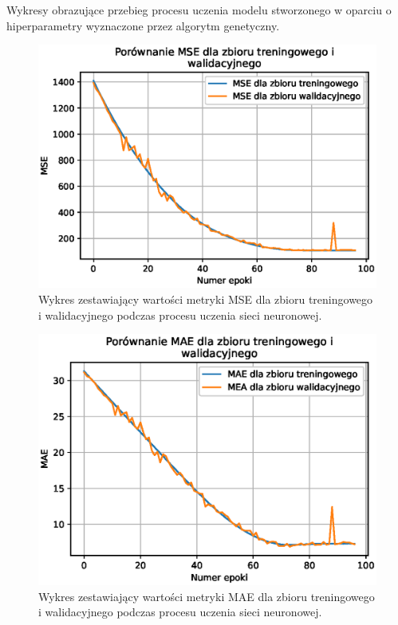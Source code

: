 \documentclass[a4paper,11pt]{article}
\begin{document}
    \bigskip

    Wykresy obrazujące przebieg procesu uczenia modelu stworzonego w oparciu o hiperparametry wyznaczone przez algorytm genetyczny.

    \begin{figure}[H]
        \label{fig:f_m_mse_train_valid}
        \centering
        \includegraphics[width=\textwidth]{f_m_mse_train_valid}
        \caption{Wykres zestawiający wartości metryki MSE dla zbioru treningowego i walidacyjnego podczas procesu uczenia sieci neuronowej.}
    \end{figure}

    \bigskip

    \begin{figure}[H]
        \label{fig:f_m_mae_train_valid}
        \centering
        \includegraphics[width=\textwidth]{f_m_mae_train_valid}
        \caption{Wykres zestawiający wartości metryki MAE dla zbioru treningowego i walidacyjnego podczas procesu uczenia sieci neuronowej.}
    \end{figure}
\end{document}
